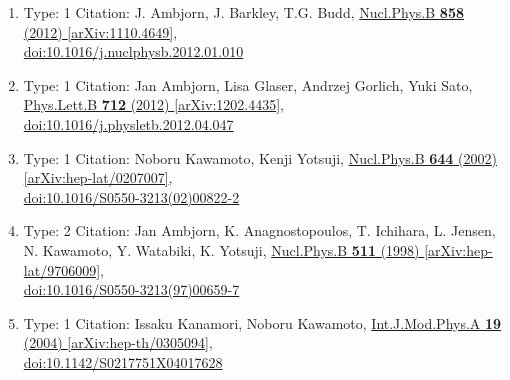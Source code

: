 \documentclass[a4paper,10pt]{article}
\begin{document}
\begin{enumerate}
\begin{enumerate}
  \item Type: 1 Citation: J. Ambjorn, J. Barkley, T.G. Budd, \href{https://www.doi.org/10.1016/j.nuclphysb.2012.01.010}{Nucl.Phys.B {\bf 858} (2012) }  \href{https://arxiv.org/abs/1110.4649}{[arXiv:1110.4649]},\\\href{https://www.doi.org/10.1016/j.nuclphysb.2012.01.010}{doi:10.1016/j.nuclphysb.2012.01.010}
  \item Type: 1 Citation: Jan Ambjorn, Lisa Glaser, Andrzej Gorlich, Yuki Sato, \href{https://www.doi.org/10.1016/j.physletb.2012.04.047}{Phys.Lett.B {\bf 712} (2012) }  \href{https://arxiv.org/abs/1202.4435}{[arXiv:1202.4435]},\\\href{https://www.doi.org/10.1016/j.physletb.2012.04.047}{doi:10.1016/j.physletb.2012.04.047}
  \item Type: 1 Citation: Noboru Kawamoto, Kenji Yotsuji, \href{https://www.doi.org/10.1016/S0550-3213(02)00822-2}{Nucl.Phys.B {\bf 644} (2002) }  \href{https://arxiv.org/abs/hep-lat/0207007}{[arXiv:hep-lat/0207007]},\\\href{https://www.doi.org/10.1016/S0550-3213(02)00822-2}{doi:10.1016/S0550-3213(02)00822-2}
  \item Type: 2 Citation: Jan Ambjorn, K. Anagnostopoulos, T. Ichihara, L. Jensen, N. Kawamoto, Y. Watabiki, K. Yotsuji, \href{https://www.doi.org/10.1016/S0550-3213(97)00659-7}{Nucl.Phys.B {\bf 511} (1998) }  \href{https://arxiv.org/abs/hep-lat/9706009}{[arXiv:hep-lat/9706009]},\\\href{https://www.doi.org/10.1016/S0550-3213(97)00659-7}{doi:10.1016/S0550-3213(97)00659-7}
  \item Type: 1 Citation: Issaku Kanamori, Noboru Kawamoto, \href{https://www.doi.org/10.1142/S0217751X04017628}{Int.J.Mod.Phys.A {\bf 19} (2004) }  \href{https://arxiv.org/abs/hep-th/0305094}{[arXiv:hep-th/0305094]},\\\href{https://www.doi.org/10.1142/S0217751X04017628}{doi:10.1142/S0217751X04017628}

\end{enumerate}
\end{enumerate}
\end{document}
